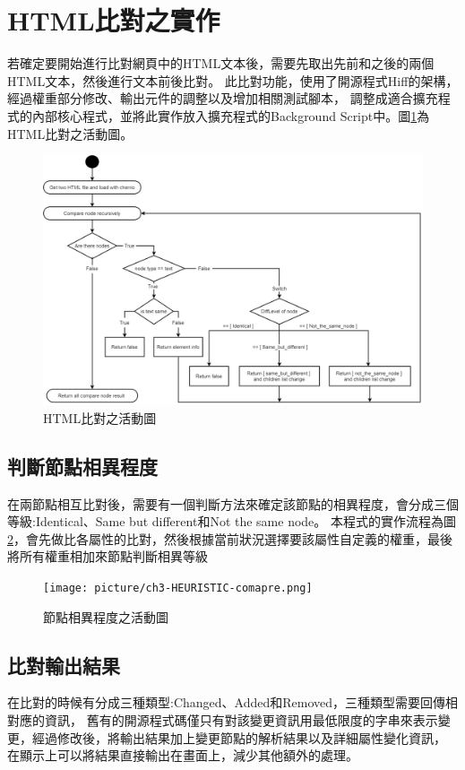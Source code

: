 \section{HTML比對之實作}\label{s3.3}
若確定要開始進行比對網頁中的HTML文本後，需要先取出先前和之後的兩個HTML文本，然後進行文本前後比對\cite{HTML-Comparison-Algorithm}。
此比對功能，使用了開源程式Hiff的架構，經過權重部分修改、輸出元件的調整以及增加相關測試腳本，
調整成適合擴充程式的內部核心程式，並將此實作放入擴充程式的Background Script中。圖\ref{f3.5}為HTML比對之活動圖。

\begin{figure}[H]
    \centering
    \includegraphics[width=1.0\textwidth]{picture/ch3-activity diagram.png}
    \caption{HTML比對之活動圖}
    \label{f3.5}
\end{figure}

\subsection{判斷節點相異程度}\label{s3.3.1}
在兩節點相互比對後，需要有一個判斷方法來確定該節點的相異程度，會分成三個等級:Identical、Same but different和Not the same node。
本程式的實作流程為圖\ref{f3.6}，會先做比各屬性的比對，然後根據當前狀況選擇要該屬性自定義的權重，最後將所有權重相加來節點判斷相異等級

\begin{figure}[H]
    \centering
    \texttt{[image: picture/ch3-HEURISTIC-comapre.png]}
    \caption{節點相異程度之活動圖}
    \label{f3.6}
\end{figure}

\subsection{比對輸出結果}\label{s3.3.2}
在比對的時候有分成三種類型:Changed、Added和Removed，三種類型需要回傳相對應的資訊，
舊有的開源程式碼僅只有對該變更資訊用最低限度的字串來表示變更，經過修改後，將輸出結果加上變更節點的解析結果以及詳細屬性變化資訊，
在顯示上可以將結果直接輸出在畫面上，減少其他額外的處理。

